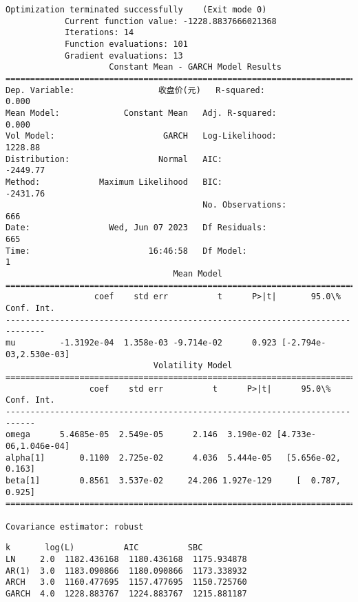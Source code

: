 \documentclass[11pt]{article}
\makeatletter
\newcommand{\boxspacing}{\kern\kvtcb@left@rule\kern\kvtcb@boxsep}
\newcommand{\prompt}[4]{
        {\ttfamily\llap{{\color{#2}[#3]:\hspace{3pt}#4}}\vspace{-\baselineskip}}
    }
\makeatother
\begin{document}
    \begin{Verbatim}[commandchars=\\\{\}]
Optimization terminated successfully    (Exit mode 0)
            Current function value: -1228.8837666021368
            Iterations: 14
            Function evaluations: 101
            Gradient evaluations: 13
                     Constant Mean - GARCH Model Results
==============================================================================
Dep. Variable:                 收盘价(元)   R-squared:                       0.000
Mean Model:             Constant Mean   Adj. R-squared:                  0.000
Vol Model:                      GARCH   Log-Likelihood:                1228.88
Distribution:                  Normal   AIC:                          -2449.77
Method:            Maximum Likelihood   BIC:                          -2431.76
                                        No. Observations:                  666
Date:                Wed, Jun 07 2023   Df Residuals:                      665
Time:                        16:46:58   Df Model:                            1
                                  Mean Model
==============================================================================
                  coef    std err          t      P>|t|       95.0\% Conf. Int.
------------------------------------------------------------------------------
mu         -1.3192e-04  1.358e-03 -9.714e-02      0.923 [-2.794e-03,2.530e-03]
                              Volatility Model
============================================================================
                 coef    std err          t      P>|t|      95.0\% Conf. Int.
----------------------------------------------------------------------------
omega      5.4685e-05  2.549e-05      2.146  3.190e-02 [4.733e-06,1.046e-04]
alpha[1]       0.1100  2.725e-02      4.036  5.444e-05   [5.656e-02,  0.163]
beta[1]        0.8561  3.537e-02     24.206 1.927e-129     [  0.787,  0.925]
============================================================================

Covariance estimator: robust
    \end{Verbatim}

            \begin{tcolorbox}[breakable, size=fbox, boxrule=.5pt, pad at break*=1mm, opacityfill=0]
\prompt{Out}{outcolor}{52}{\boxspacing}
\begin{Verbatim}[commandchars=\\\{\}]
         k       log(L)          AIC          SBC
LN     2.0  1182.436168  1180.436168  1175.934878
AR(1)  3.0  1183.090866  1180.090866  1173.338932
ARCH   3.0  1160.477695  1157.477695  1150.725760
GARCH  4.0  1228.883767  1224.883767  1215.881187
\end{Verbatim}
\end{tcolorbox}
\end{document}
